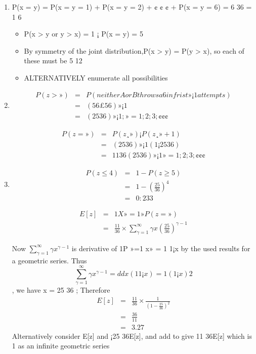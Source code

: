 \documentclass[a4paper,12pt]{article}
\begin{document}
\begin{enumerate}
    \item 
P(x = y) = P(x = y = 1) + P(x = y = 2) + ¢ ¢ ¢ + P(x = y = 6) = 6
36 = 1
6
\begin{itemize}
    \item P(x > y or y > x) = 1 ¡ P(x = y) = 5
\item By symmetry of the joint distribution,P(x > y) = P(y > x), so each of these must be
5
12
\item ALTERNATIVELY enumerate all possibilities
\end{itemize}

\item 
\begin{eqnarray*}
P(z > ») &=& P(neither A or B throws a 6 in frist » ¡ 1 attempts)\\
&=& ( 5
6 £ 5
6 )»¡1 \\
&=& ( 25
36 )»¡1; » = 1; 2; 3; ¢ ¢ ¢
\end{eqnarray*}

\begin{eqnarray*}
P(z = ») &=& P(z ¸ ») ¡ P(z ¸ » + 1)\\
&=& ( 25
36 )»¡1(1 ¡ 25
36 ) \\
&=& 11
36 ( 25
36 )»¡1 » = 1; 2; 3; ¢ ¢ ¢
\end{eqnarray*}

\item 
\begin{eqnarray*}
P(z \leq 4) &=& 1 - P(z \geq 5) \\
&=& 1 - \left(
 \frac{25}{
36} \right
)^4 \\
&=&  0:233
\end{eqnarray*}


\begin{eqnarray*}
E[z] &=&
1X
»=1
»P(z = ») \\ &=& \frac{11}{36} \times \sum^{\infty}_{\gamma=1} \gamma x 
\left(\frac{25}{36}
\right)^{\gamma-1}
\end{eqnarray*}

Now
$\sum^{\infty}_{\gamma=1} \gamma x ^{\gamma-1}$ is derivative of
1P
»=1
x» = 1
1¡x by the used results for a geometric series.
Thus
\[\sum^{\infty}_{\gamma=1} \gamma x ^{\gamma-1} = d
dx ( 1
1¡x ) = 1
(1¡x)2 \], we have x = 25
36 ;
Therefore
\begin{eqnarray*}
E[z] &=& \frac{11}{36} \times \frac{1}{(1- \frac{25}{36})^2} \\ &=& \frac{36}{11} 
\\ &=& 3.27
\end{eqnarray*}
Alternatively consider E[z] and ¡25
36E[z], and add to give 11
36E[z] which is 1 as an
infinite geometric series
\end{enumerate}
\end{document}
